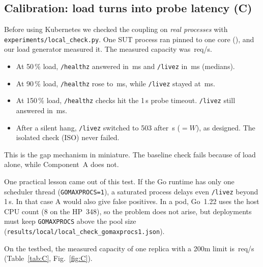 \documentclass[conference]{IEEEtran}
\makeatletter
\newcommand{\TBN}[1]{\@ifundefined{tbn@#1}{\textit{pending}}{\@nameuse{tbn@#1}}}
\makeatother
\begin{document}
\subsection{Calibration: load turns into probe latency (C)}
Before using Kubernetes we checked the coupling on \emph{real processes}
with \texttt{experiments/local\_check.py}. One SUT process ran pinned to
one core (\locMode), and our load generator measured it. The measured
capacity was \locCap\,req/s.
\begin{itemize}
\item At 50\,\% load, \texttt{/healthz} answered in \locHzFifty\,ms and
  \texttt{/livez} in \locLzFifty\,ms (medians).
\item At 90\,\% load, \texttt{/healthz} rose to \locHzNinety\,ms, while
  \texttt{/livez} stayed at \locLzNinety\,ms.
\item At 150\,\% load, \locHzFailOneFifty{} \texttt{/healthz} checks hit
  the 1\,s probe timeout. \texttt{/livez} still answered in
  \locLzOneFifty\,ms.
\item After a silent hang, \texttt{/livez} switched to 503 after
  \locHang\,s ($=W$), as designed. The isolated check (ISO) never failed.
\end{itemize}
This is the gap mechanism in miniature. The baseline check fails
because of load alone, while Component~A does not.

One practical lesson came out of this test. If the Go runtime has only
one scheduler thread (\texttt{GOMAXPROCS=1}), a saturated process
delays even \texttt{/livez} beyond 1\,s. In that case A would also give
false positives. In a pod, Go~1.22 uses the host CPU count (8 on the
HP~348), so the problem does not arise, but deployments must keep
\texttt{GOMAXPROCS} above the pool size
(\texttt{results/local/local\_check\_gomaxprocs1.json}).

On the testbed, the measured capacity of one replica with a 200m limit
is \TBN{cap}\,req/s (Table~\ref{tab:C}, Fig.~\ref{fig:C}).
\end{document}
